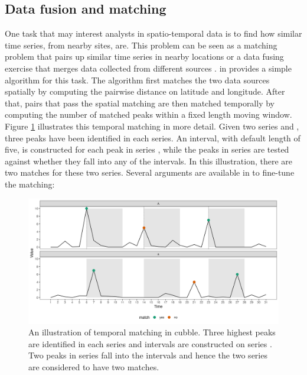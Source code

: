 \documentclass[
]{jss}
\begin{document}
\hypertarget{matching}{%
\subsection{Data fusion and matching}\label{matching}}

One task that may interest analysts in spatio-temporal data is to find how similar time series, from nearby sites, are. This problem can be seen as a matching problem \citep{stuart2010matching, mcintosh2018using} that pairs up similar time series in nearby locations or a data fusing exercise that merges data collected from different sources \citep{cocchi2019data}.  in  provides a simple algorithm for this task. The algorithm first matches the two data sources spatially by computing the pairwise distance on latitude and longitude. After that, pairs that pass the spatial matching are then matched temporally by computing the number of matched peaks within a fixed length moving window. Figure \ref{fig:illu-matching} illustrates this temporal matching in more detail. Given two series  and , three peaks have been identified in each series. An interval, with default length of five, is constructed for each peak in series , while the peaks in series  are tested against whether they fall into any of the intervals. In this illustration, there are two matches for these two series. Several arguments are available in  to fine-tune the matching:

\begin{CodeChunk}
\begin{figure}

{\centering \includegraphics[width=1\linewidth]{../figures/illu-matching} 

}

\caption{An illustration of temporal matching in cubble. Three highest peaks are identified in each series and intervals are constructed on series . Two peaks in series  fall into the intervals and hence the two series are considered to have two matches.}\label{fig:illu-matching}
\end{figure}
\end{CodeChunk}
\end{document}
